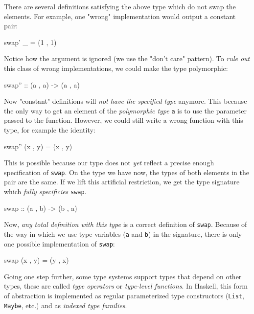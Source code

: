            There are several definitions satisfying the above type which do not swap the elements.
            For example, one "wrong" implementation would output a constant pair:
            \begin{haskellcode}
        swap' _ = (1 , 1)
            \end{haskellcode}

            Notice how the argument is ignored (we use the "don't care" pattern).
            To \emph{rule out} this class of wrong implementations, we could make the type polymorphic:
            \begin{haskellcode}
        swap'' :: (a , a) -> (a , a)
            \end{haskellcode}

            Now "constant" definitions will \emph{not have the specified type} anymore.
            This because the only way to get an element of the \emph{polymorphic type} \texttt{a}
            is to use the parameter passed to the function.
            However, we could still write a wrong function with this type, for example the identity:
            \begin{haskellcode}
        swap'' (x , y) = (x , y)
            \end{haskellcode}

            This is possible because our type does not \emph{yet} reflect a precise enough specification of \texttt{swap}.
            On the type we have now, the types of both elements in the pair are the same.
            If we lift this artificial restriction, we get the type signature which \emph{fully specificies} \texttt{swap}.
            \begin{haskellcode}
        swap :: (a , b) -> (b , a)
            \end{haskellcode}

            Now, \emph{any total definition with this type} is a correct definition of \texttt{swap}.
            Because of the way in which we use type variables (\texttt{a} and \texttt{b}) in the signature,
            there is only one possible implementation of \texttt{swap}:
            \begin{haskellcode}
        swap (x , y) = (y , x)
            \end{haskellcode}

            Going one step further, some type systems support types that depend on other types, these are
            called \emph{type operators} or \emph{type-level functions}.
            In Haskell, this form of abstraction is implemented as regular parameterized type constructors
            (\texttt{List}, \texttt{Maybe}, etc.) and as \emph{indexed type families}.

